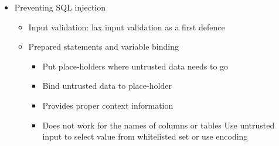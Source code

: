 \documentclass[12pt,titlepage,a4paper]{report}
\begin{document}
\begin{itemize}
		\item Preventing SQL injection
		\begin{itemize}
			\item Input validation: lax input validation as a first defence
			\item Prepared statements and variable binding
			\begin{itemize}
				\item Put place-holders where untrusted data needs to go
				\item Bind untrusted data to place-holder
				\item Provides proper context information
				\item Does not work for the names of columns or tables
					\subitem Use untrusted input to select value from whitelisted set or use encoding
			\end{itemize}
		\end{itemize}
	\end{itemize}
	
\end{document}
